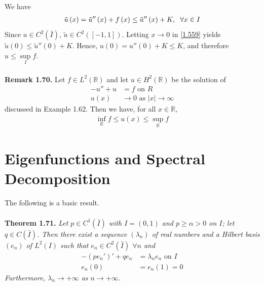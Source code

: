 \documentclass[a4paper,oneside]{article}
\numberwithin{equation}{section}
\begin{document}
We have
\begin{align}
\label{1.559}
\tilde u\left( x \right) = \tilde u''\left( x \right) + f\left( x \right) \le \tilde u''\left( x \right) + K,\hspace{0.2cm}\forall x \in I
\end{align}
Since $u\in C^2\left(\bar I\right)$, $\tilde u\in C^2\left(\left[-1,1\right]\right)$. Letting $x\to 0$ in \eqref{1.559} yields $\tilde u\left( 0 \right) \le \tilde u''\left( 0 \right) + K$. Hence, $u\left(0\right)=u''\left(0\right)+K \le K$, and therefore $u \le \mathop {\sup }\limits_I f$.\\
\\
\textbf{Remark 1.70.} Let $f\in L^2\left(\mathbb{R}\right)$ and let $u\in H^2\left(\mathbb{R}\right)$ be the solution of 
\begin{align}
 - u'' + u &= f\mbox{ on } R\\
u\left( x \right) &\to 0\mbox{ as } \left| x \right| \to \infty 
\end{align}
discussed in Example 1.62. Then we have, for all $x\in \mathbb{R}$,
\begin{align}
\mathop {\inf }\limits_{\mathbb{R}} f \le u\left( x \right) \le \mathop {\sup }\limits_{\mathbb{R}} f
\end{align}
\section{Eigenfunctions and Spectral Decomposition}
The following is a basic result.\\
\\
\textbf{Theorem 1.71.} \textit{Let $p\in C^1\left(\bar I\right)$ with $I=\left(0,1\right)$ and $p\ge \alpha >0$ on $I$; let $q\in C\left(\bar I\right)$. Then there exist a sequence $\left(\lambda _n\right)$ of real numbers and a Hilbert basis $\left(e_n\right)$ of $L^2\left(I\right)$ such that $e_n\in C^2\left(\bar I\right)$ $\forall n$ and}
\begin{align}
\label{1.563}
 - \left( {p{e_n}'} \right)' + q{e_n} &= {\lambda _n}{e_n}\mbox{ on } I\\
{e_n}\left( 0 \right) &= {e_n}\left( 1 \right) = 0 \label{1.564}
\end{align}
\textit{Furthermore, $\lambda _n\to +\infty$ as $n\to +\infty$.}\\
\end{document}
